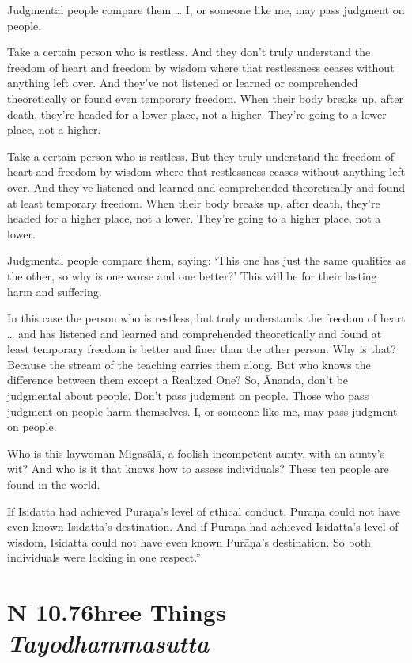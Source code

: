 \documentclass[12pt,openany]{book}%
\newcommand*{\suttatitleacronym}[1]{\smaller[2]{#1}\vspace*{.3em}}
\newcommand*{\suttatitletranslation}[1]{\linebreak{#1}}
\newcommand*{\suttatitleroot}[1]{\linebreak\smaller[2]\itshape{#1}}
\newcommand*{\tocacronym}[1]{\hspace*{-3.3em}{#1}\quad}
\newcommand*{\toctranslation}[1]{#1}
\newcommand*{\tocroot}[1]{(\textit{#1})}
\begin{document}
Judgmental people compare them … I, or someone like me, may pass judgment on people. 

Take a certain person who is restless. And they don’t truly understand the freedom of heart and freedom by wisdom where that restlessness ceases without anything left over. And they’ve not listened or learned or comprehended theoretically or found even temporary freedom. When their body breaks up, after death, they’re headed for a lower place, not a higher. They’re going to a lower place, not a higher. 

Take a certain person who is restless. But they truly understand the freedom of heart and freedom by wisdom where that restlessness ceases without anything left over. And they’ve listened and learned and comprehended theoretically and found at least temporary freedom. When their body breaks up, after death, they’re headed for a higher place, not a lower. They’re going to a higher place, not a lower. 

Judgmental people compare them, saying: ‘This one has just the same qualities as the other, so why is one worse and one better?’ This will be for their lasting harm and suffering. 

In this case the person who is restless, but truly understands the freedom of heart … and has listened and learned and comprehended theoretically and found at least temporary freedom is better and finer than the other person. Why is that? Because the stream of the teaching carries them along. But who knows the difference between them except a Realized One? So, Ānanda, don’t be judgmental about people. Don’t pass judgment on people. Those who pass judgment on people harm themselves. I, or someone like me, may pass judgment on people. 

Who is this laywoman \textsanskrit{Migasālā}, a foolish incompetent aunty, with an aunty’s wit? And who is it that knows how to assess individuals? These ten people are found in the world. 

If Isidatta had achieved \textsanskrit{Purāṇa}’s level of ethical conduct, \textsanskrit{Purāṇa} could not have even known Isidatta’s destination. And if \textsanskrit{Purāṇa} had achieved Isidatta’s level of wisdom, Isidatta could not have even known \textsanskrit{Purāṇa}’s destination. So both individuals were lacking in one respect.” 

%
\section*{{\suttatitleacronym AN 10.76}{\suttatitletranslation Three Things }{\suttatitleroot Tayodhammasutta}}
\addcontentsline{toc}{section}{\tocacronym{AN 10.76} \toctranslation{Three Things } \tocroot{Tayodhammasutta}}
\end{document}
